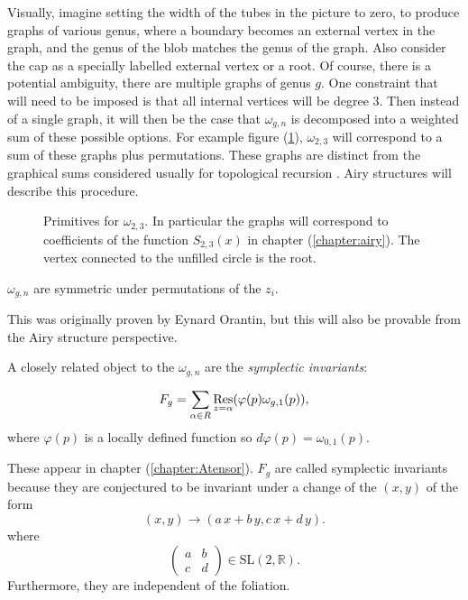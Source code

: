    Visually, imagine setting the width of the tubes in the picture to zero, to produce graphs of various genus, where a boundary becomes an external vertex in the graph, and the genus of the blob matches the genus of the graph. Also consider the cap as a specially labelled external vertex or a root. Of course, there is a potential ambiguity, there are multiple graphs of genus \(g\). One constraint that will need to be imposed is that all internal vertices will be degree \(3\). Then instead of a single graph, it will then be the case that \(\omega_{g,n}\) is decomposed into a weighted sum of these possible options. For example figure (\ref{fig:trprim}), \( \omega_{2,3}\) will correspond to a sum of these graphs plus permutations. These graphs are distinct from the graphical sums considered usually for topological recursion \cite{eynard_orantin}. Airy structures will describe this procedure. 
    \begin{figure}[!htb]
        \centering 
        
        \caption{Primitives for \( \omega_{2,3}\). In particular the graphs will correspond to coefficients of the function \( S_{2,3}(x)\) in chapter (\ref{chapter:airy}). The vertex connected to the unfilled circle is the root.}
        \label{fig:trprim}
    \end{figure}

    

    \begin{lem}
    \( \omega_{g,n}\) are symmetric under permutations of the \(z_i\).
    \end{lem}
    This was originally proven by Eynard Orantin, but this will also be provable from the Airy structure perspective.
    
    A closely related object to the \( \omega_{g,n}\) are the \emph{symplectic invariants}:
    
    \begin{defn}
    \[ F_g = \sum_{\alpha \in R} \operatorname*{Res}_{z=\alpha}(\varphi(p) \omega_{g,1}(p) ),\]
    where \( \varphi(p)\) is a locally defined function so \( d \varphi(p) = \omega_{0,1}(p)\).
    \end{defn}

    These appear in chapter (\ref{chapter:Atensor}). \(F_g\) are called symplectic invariants because they are conjectured to be invariant under a change of the \( (x,y)\) of the form
    \[ ( x, y ) \rightarrow ( a \,x + b\, y, c\, x + d \,y ). \] 
    where 
    \[ \left( \begin{array}{cc}
         a & b   \\
         c & d 
    \end{array} \right) \in \mathrm{SL}(2, \mathbb{R} ). \]
    Furthermore, they are independent of the foliation.
    
